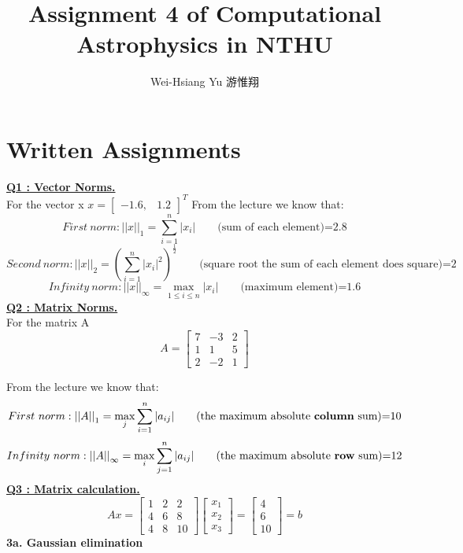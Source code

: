 \documentclass{article}
\title{Assignment 4 of Computational Astrophysics in NTHU}
\author{Wei-Hsiang Yu 游惟翔}
\begin{document}
\begin{CJK}{UTF8}{bsmi}
\maketitle
\end{CJK}


\section{Written Assignments}
\underline{\textbf{Q1 : Vector Norms.}}\\

For the vector x
$x=
{\begin{bmatrix}
-1.6,& 1.2
\end{bmatrix}}^T
$
From the lecture we know that:
\[ 
First\ norm:{||x||}_1=\sum_{i=1}^{n}|x_i|
\qquad \mbox{(sum of each element)=2.8}
\]
\[ 
Second\ norm:{||x||}_2=(\sum_{i=1}^{n}|x_i|^2)^{\frac{1}{2}}
\qquad \mbox{(square root the sum of each element does square)=2}
\]
\[ 
Infinity\ norm:{||x||}_\infty=\max_{1 \leq i \leq n}|x_i|
\qquad \mbox{(maximum element)=1.6}
\]
\underline{\textbf{Q2 : Matrix Norms.}}\\

For the matrix A
\[
A=
{\begin{bmatrix}
7 & -3 & 2\\
1 & 1 & 5\\
2 &-2 & 1
\end{bmatrix}}
\]

From the lecture we know that:
\[ 
First\ norm:{||A||}_1=\max_{j}\sum_{i=1}^{n}|a_{ij}|
\qquad \mbox{(the maximum absolute \textbf{column} sum)=10}
\]
\[ 
Infinity\ norm:{||A||}_\infty=\max_{i}\sum_{j=1}^{n}|a_{ij}|
\qquad \mbox{(the maximum absolute \textbf{row} sum)=12}
\]
\underline{\textbf{Q3 : Matrix calculation.}}\\
\[
Ax=
{\begin{bmatrix}
1 & 2 & 2\\
4 & 6 & 8\\
4 & 8 & 10
\end{bmatrix}}
{\begin{bmatrix}
x_1\\
x_2\\
x_3
\end{bmatrix}}
=
{\begin{bmatrix}
4\\
6\\
10
\end{bmatrix}}
=b
\]
\textbf{3a. Gaussian elimination}\\
\end{document}
